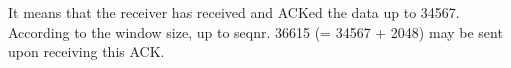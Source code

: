 It means that the receiver has received and ACKed the data up to 34567.
 According to the window size, up to seqnr. 36615 (= 34567 + 2048) may be sent upon receiving this ACK.
